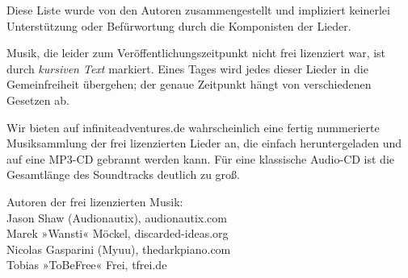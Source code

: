 Diese Liste wurde von den Autoren zusammengestellt und impliziert keinerlei Unterstützung oder Befürwortung durch die Komponisten der Lieder.

Musik, die leider zum Veröffentlichungszeitpunkt nicht frei lizenziert war, ist durch \textit{kursiven Text} markiert. Eines Tages wird jedes dieser Lieder in die Gemeinfreiheit übergehen; der genaue Zeitpunkt hängt von verschiedenen Gesetzen ab.

Wir bieten auf infiniteadventures.de wahrscheinlich eine fertig nummerierte Musiksammlung der frei lizenzierten Lieder an, die einfach heruntergeladen und auf eine MP3-CD gebrannt werden kann. Für eine klassische Audio-CD ist die Gesamtlänge des Soundtracks deutlich zu groß.

Autoren der frei lizenzierten Musik:\\
Jason Shaw (Audionautix), audionautix.com\\
Marek »Wansti« Möckel, discarded-ideas.org\\
Nicolas Gasparini (Myuu), thedarkpiano.com\\
Tobias »ToBeFree« Frei, tfrei.de

